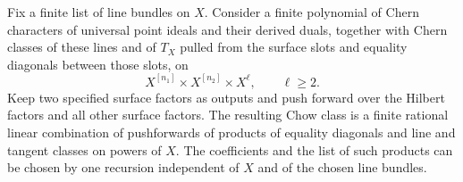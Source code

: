 \begin{lemma}
\label{rel:marked-reduction}
Fix a finite list of line bundles on $X$.  Consider a finite polynomial
of Chern characters of universal point ideals and their derived duals,
together with Chern classes of these lines and of $T_X$ pulled from
the surface slots and equality diagonals between those slots, on
\[
 X^{[n_1]}\times X^{[n_2]}\times X^\ell,
 \qquad \ell\geq2.
\]
Keep two specified surface factors as outputs and push forward over
the Hilbert factors and all other surface factors.  The resulting
Chow class is a finite rational linear combination of pushforwards of
products of equality diagonals and line and tangent classes on powers
of $X$.  The coefficients and the list of such products can be chosen
by one recursion independent of $X$ and of the chosen line bundles.
\end{lemma}

